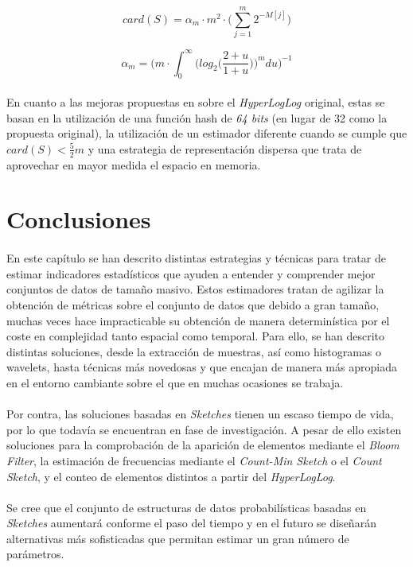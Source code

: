 \documentclass{subfiles}
\begin{document}
      \begin{equation}
      \label{eq:hyper_log_log_estimation}
        card(S) = \alpha_m \cdot m^2 \cdot \bigg( \sum_{j=1}^{m}2^{-M[j]}\bigg)
      \end{equation}

      \begin{equation}
      \label{eq:hyper_log_log_alpha}
        \alpha_m = \bigg(m \cdot \int_0^\infty \bigg(log_2\bigg(\frac{2+u}{1+u}\bigg)\bigg)^m du\bigg)^{-1}
      \end{equation}

      \paragraph{}
      En cuanto a las mejoras propuestas en \cite{heule2013hyperloglog} sobre el \emph{HyperLogLog} original, estas se basan en la utilización de una función hash de \emph{64 bits} (en lugar de 32 como la propuesta original), la utilización de un estimador diferente cuando se cumple que $card(S) < \frac{5}{2}m$ y una estrategia de representación dispersa que trata de aprovechar en mayor medida el espacio en memoria.


    \section{Conclusiones}
    \label{sec:summaries_conclusions}

      \paragraph{}
      En este capítulo se han descrito distintas estrategias y técnicas para tratar de estimar indicadores estadísticos que ayuden a entender y comprender mejor conjuntos de datos de tamaño masivo. Estos estimadores tratan de agilizar la obtención de métricas sobre el conjunto de datos que debido a gran tamaño, muchas veces hace impracticable su obtención de manera determinística por el coste en complejidad tanto espacial como temporal. Para ello, se han descrito distintas soluciones, desde la extracción de muestras, así como histogramas o wavelets, hasta técnicas más novedosas y que encajan de manera más apropiada en el entorno cambiante sobre el que en muchas ocasiones se trabaja.

      \paragraph{}
      Por contra, las soluciones basadas en \emph{Sketches} tienen un escaso tiempo de vida, por lo que todavía se encuentran en fase de investigación. A pesar de ello existen soluciones para la comprobación de la aparición de elementos mediante el \emph{Bloom Filter}, la estimación de frecuencias mediante el \emph{Count-Min Sketch} o el \emph{Count Sketch}, y el conteo de elementos distintos a partir del \emph{HyperLogLog}.

      \paragraph{}
      Se cree que el conjunto de estructuras de datos probabilísticas basadas en \emph{Sketches} aumentará conforme el paso del tiempo y en el futuro se diseñarán alternativas más sofisticadas que permitan estimar un gran número de parámetros.
\end{document}
